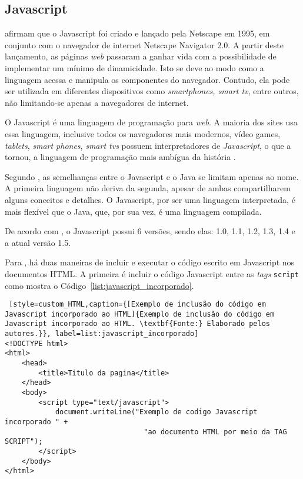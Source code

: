 \subsection{Javascript}

 afirmam que o Javascript foi criado e lançado pela Netscape em 1995, em conjunto com o navegador de internet Netscape Navigator 2.0. A partir deste lançamento, as páginas \textit{web} passaram a ganhar vida com a possibilidade de implementar um mínimo de dinamicidade. Isto se deve ao modo como a linguagem acessa e manipula os componentes do navegador. Contudo, ela pode ser utilizada em diferentes dispositivos como \textit{smartphones, smart tv}, entre outros, não limitando-se apenas a navegadores de internet.

O Javascript é uma linguagem de programação para \textit{web}. A maioria dos sites usa essa linguagem, inclusive todos os navegadores mais modernos, vídeo games, \textit{tablets}, \textit{smart phones}, \textit{smart tvs} possuem interpretadores de \textit{Javascript}, o que a tornou, a linguagem de programação mais ambígua da história \cite{flanagan_javascript_definitive_guide}.

Segundo , as semelhanças entre o Javascript e o Java se limitam apenas ao nome. A primeira linguagem não deriva da segunda, apesar de ambas compartilharem alguns conceitos e detalhes. O Javascript, por ser uma linguagem interpretada, é mais flexível que o Java, que, por sua vez, é uma linguagem compilada.

De acordo com , o Javascript possui 6 versões, sendo elas: 1.0, 1.1, 1.2, 1.3, 1.4 e a atual versão 1.5.

Para , há duas maneiras de incluir e executar o código escrito em Javascript nos documentos HTML. A primeira é incluir o código Javascript entre as \textit{tags} \texttt{script} como mostra o Código~\ref{list:javascript_incorporado}. 

\begin{lstlisting} [style=custom_HTML,caption={[Exemplo de inclusão do código em Javascript incorporado ao HTML]{Exemplo de inclusão do código em Javascript incorporado ao HTML. \textbf{Fonte:} Elaborado pelos autores.}}, label=list:javascript_incorporado] 	
<!DOCTYPE html>
<html>
	<head>
		<title>Titulo da pagina</title>
	</head>
	<body>
		<script type="text/javascript">
			document.writeLine("Exemplo de codigo Javascript incorporado " +
								 "ao documento HTML por meio da TAG SCRIPT");
		</script>
	</body>
</html>
\end{lstlisting}

